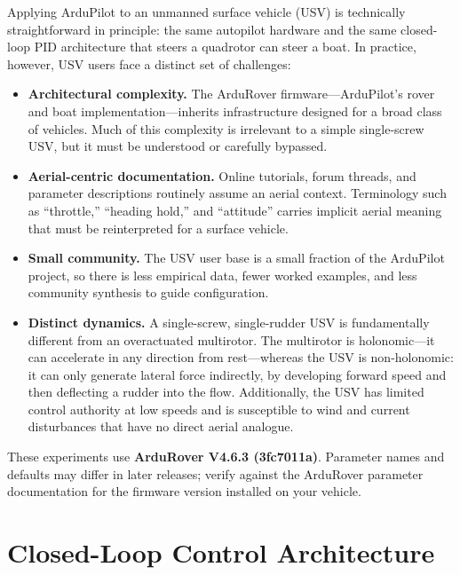 \documentclass[../../book.tex]{subfiles}
\begin{document}
Applying ArduPilot to an unmanned surface vehicle (USV) is technically straightforward in principle: the same autopilot hardware and the same closed-loop PID architecture that steers a quadrotor can steer a boat.  In practice, however, USV users face a distinct set of challenges:

\begin{itemize}
  \item \textbf{Architectural complexity.}  The ArduRover firmware---ArduPilot's rover and boat implementation---inherits infrastructure designed for a broad class of vehicles.  Much of this complexity is irrelevant to a simple single-screw USV, but it must be understood or carefully bypassed.

  \item \textbf{Aerial-centric documentation.}  Online tutorials, forum threads, and parameter descriptions routinely assume an aerial context.  Terminology such as ``throttle,'' ``heading hold,'' and ``attitude'' carries implicit aerial meaning that must be reinterpreted for a surface vehicle.

  \item \textbf{Small community.}  The USV user base is a small fraction of the ArduPilot project, so there is less empirical data, fewer worked examples, and less community synthesis to guide configuration.

  \item \textbf{Distinct dynamics.}  A single-screw, single-rudder USV is fundamentally different from an overactuated multirotor.  The multirotor is holonomic---it can accelerate in any direction from rest---whereas the USV is non-holonomic: it can only generate lateral force indirectly, by developing forward speed and then deflecting a rudder into the flow.  Additionally, the USV has limited control authority at low speeds and is susceptible to wind and current disturbances that have no direct aerial analogue.
\end{itemize}

These experiments use \textbf{ArduRover V4.6.3 (3fc7011a)}.  Parameter names and defaults may differ in later releases; verify against the ArduRover parameter documentation for the firmware version installed on your vehicle.

\section{Closed-Loop Control Architecture}
\end{document}
